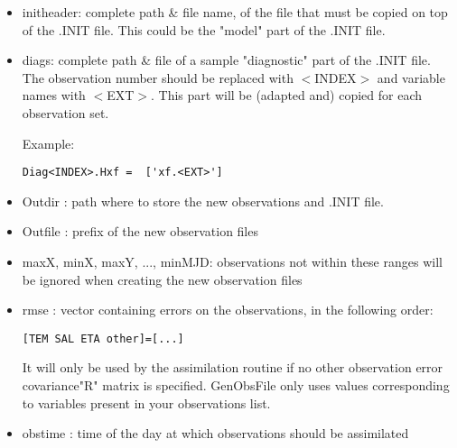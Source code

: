 \documentclass[a4paper,12pt]{article}
\begin{document}
\begin{itemize}
\item initheader: complete path \& file name, of the file that must be copied on top of the .INIT file. This could be the "model" part of the .INIT file.

\item diags: complete path \& file of a sample "diagnostic" part of the .INIT file. The observation number should be replaced with $<$INDEX$>$ and variable names with $<$EXT$>$. This part will be (adapted and) copied for each 
observation set.

Example: 
\begin{verbatim}
Diag<INDEX>.Hxf =  ['xf.<EXT>']
\end{verbatim}

\item Outdir : path where to store the new observations and .INIT file.

\item Outfile : prefix of the new observation files

\item maxX, minX, maxY, ..., minMJD: observations not within these ranges will be ignored when creating the new observation files

\item rmse : vector containing errors on the observations, in the
  following order:

\begin{verbatim}
[TEM SAL ETA other]=[...]
\end{verbatim}
It will only be used by the assimilation routine if no other observation error covariance"R" matrix is specified. GenObsFile only uses values corresponding to variables present in your observations list.

\item obstime : time of the day at which observations should be assimilated


\end{itemize}
\end{document}
